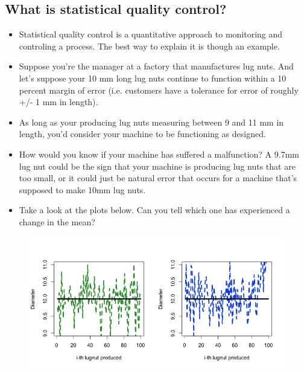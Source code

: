 \documentclass[a4paper,12pt]{article}
\begin{document}
\subsection{What is statistical quality control?}
\begin{itemize}
\item Statistical quality control is a quantitative approach to monitoring and controling a process. The best way to explain it is though an example.

\item  Suppose you're the manager at a factory that manufactures lug nuts. And let's suppose your 10 mm long lug nuts continue to function within a 10 percent margin of error (i.e. customers have a tolerance for error of roughly +/- 1 mm in length). 

\item As long as your producing lug nuts measuring between 9 and 11 mm in length, you'd consider your machine to be functioning as designed.

\item  How would you know if your machine has suffered a malfunction? A 9.7mm lug nut could be the sign that your machine is producing lug nuts that are too small, or it could just be natural error that occurs for a machine that's supposed to make 10mm lug nuts.

\item  Take a look at the plots below. Can you tell which one has experienced a change in the mean?
\end{itemize}
\begin{figure}[h!]
\centering
\includegraphics[width=0.99\linewidth]{./sqcr1}
\caption{}
\label{fig:sqcr1}
\end{figure}
\newpage
\end{document}
